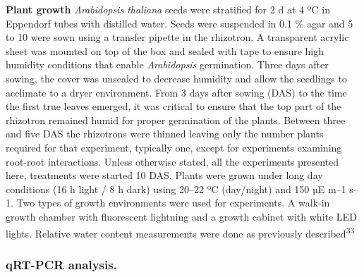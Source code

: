 \documentclass[]{article}
\begin{document}
\textbf{Plant growth} \emph{Arabidopsis thaliana} seeds were stratified
for 2 d at 4 ºC in Eppendorf tubes with distilled water. Seeds were
suspended in 0.1 \% agar and 5 to 10 were sown using a transfer pipette
in the rhizotron. A transparent acrylic sheet was mounted on top of the
box and sealed with tape to ensure high humidity conditions that enable
\emph{Arabidopsis} germination. Three days after sowing, the cover was
unsealed to decrease humidity and allow the seedlings to acclimate to a
dryer environment. From 3 days after sowing (DAS) to the time the first
true leaves emerged, it was critical to ensure that the top part of the
rhizotron remained humid for proper germination of the plants. Between
three and five DAS the rhizotrons were thinned leaving only the number
plants required for that experiment, typically one, except for
experiments examining root-root interactions. Unless otherwise stated,
all the experiments presented here, treatments were started 10 DAS.
Plants were grown under long day conditions (16 h light / 8 h dark)
using 20--22 ºC (day/night) and 150 µE m--1 s--1. Two types of growth
environments were used for experiments. A walk-in growth chamber with
fluorescent lightning and a growth cabinet with white LED lights.
Relative water content measurements were done as previously
described\textsuperscript{33}

\subsubsection{qRT-PCR analysis.}\label{qrt-pcr-analysis.}
\end{document}
